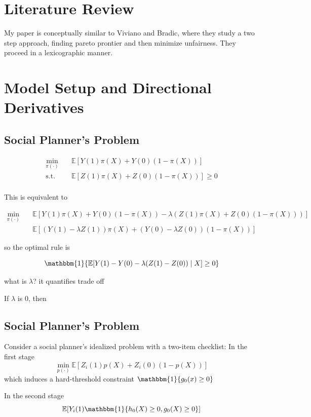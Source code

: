 \documentclass[12pt]{article}
\newcommand{\1}{\mathbf{1}}
\begin{document}
\section{Literature Review}
My paper is conceptually similar to Viviano and Bradic, where they study a two step approach, finding pareto prontier and then minimize unfairness. They proceed in a lexicographic manner. \cite{viviano2024fair}


\section{Model Setup and Directional Derivatives}
\subsection{Social Planner's Problem}

\begin{align*}
\min_{\pi(\cdot)} \quad &\mathbb{E}\left[Y(1)\pi(X) + Y(0)(1-\pi(X))\right]\\
\textrm{s.t.} \quad & \mathbb{E}[Z(1)\pi(X) + Z(0)(1-\pi(X))]\geq 0\\
\end{align*}

This is equivalent to

\begin{align*}
\min_{\pi(\cdot)} \quad &\mathbb{E}\left[Y(1)\pi(X) + Y(0)(1-\pi(X)) - \lambda(Z(1)\pi(X) + Z(0)(1-\pi(X)))\right]\\
& \mathbb{E}[(Y(1) - \lambda Z(1))\pi(X) + (Y(0) - \lambda Z(0))(1-\pi(X))]
\end{align*}

so the optimal rule is

\[
\mathbbm{1}\{\mathbb{E}[Y(1) - Y(0) - \lambda(Z(1) - Z(0)) \mid X] \geq 0\}
\]

what is $\lambda$? it quantifies trade off

If $\lambda$ is 0, then 


\subsection{Social Planner's Problem}
Consider a social planner's idealized problem with a two-item checklist: 
In the first stage
\[
\min_{p(\cdot)}\mathbb{E}\left[Z_i(1)p(X) + Z_i(0)(1-p(X))\right]
\]
which induces a hard-threshold constraint $\mathbbm{1}\{g_0(x) \geq 0\}$

In the second stage
\[
\mathbb{E}[Y_i(1)\mathbbm{1}\{h_0(X) \geq 0, g_0(X) \geq 0\}]
\]
\end{document}
